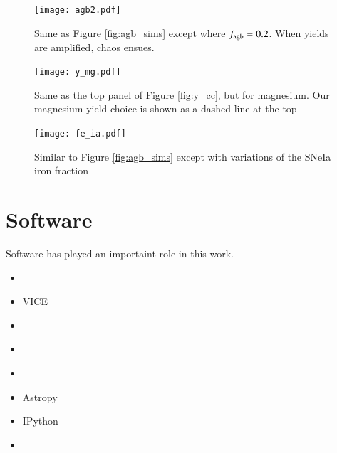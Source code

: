 \documentclass[12pt,oneside]{report}
\begin{document}
\begin{figure}[htp]
    \centering
    \texttt{[image: agb2.pdf]}

    \caption[Alternate AGB models]{Same as Figure \ref{fig:agb_sims} except where $f_{\rm agb}=0.2$. When yields are amplified, chaos ensues.}
\end{figure}


\begin{figure}
    \centering
    \texttt{[image: y\_mg.pdf]}
    \caption[Magnesium CCSNe yields]{Same as the top panel of Figure \ref{fig:y_cc}, but for magnesium. Our magnesium yield choice is shown as a dashed line at the top
    }
\end{figure}

\begin{figure}
    \centering
    \texttt{[image: fe\_ia.pdf]}
    \caption[Adjusting type Ia iron]{Similar to Figure \ref{fig:agb_sims} except with variations of the SNeIa iron fraction}
\end{figure}




\label{lastpage}

\section{Software}
Software has played an importaint role in this work. 
\begin{itemize}
    \item \citep{OhioSupercomputerCenter1987}
    \item VICE \citet{JW20} \citet{james+21}
    \item \cite{matplotlib}
    \item \citet{numpy}
    \item \citet{pandas}
    \item Astropy \citep{astropy:2013, astropy:2018, astropy:2022}
    \item IPython \citep{ipy}
    \item \citep{scipy}
\end{itemize}
\end{document}
